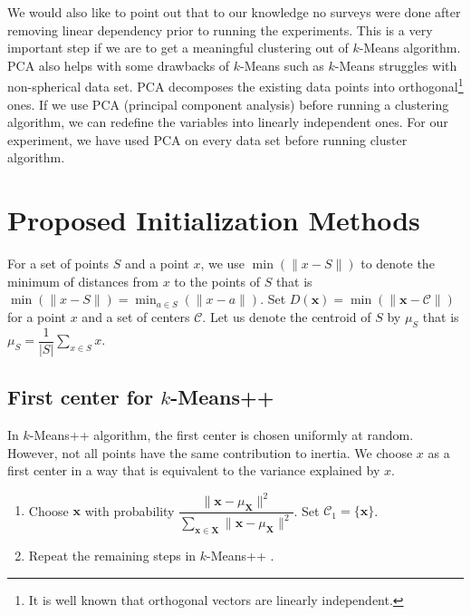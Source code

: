\documentclass[twoside, 11pt]{article}
\newcommand{\x}{\mathbf{x}}
\newcommand{\X}{\mathbf{X}}
\newcommand{\C}{\mathcal{C}}
\begin{document}
	We would also like to point out that to our knowledge no surveys were done after removing linear dependency prior to running the experiments. This is a very important step if we are to get a meaningful clustering out of $k$-Means algorithm. PCA also helps with some drawbacks of $k$-Means such as $k$-Means struggles with non-spherical data set. PCA decomposes the existing data points into orthogonal\footnote{It is well known that orthogonal vectors are linearly independent.} ones. If we use PCA (principal component analysis) before running a clustering algorithm, we can redefine the variables into linearly independent ones. For our experiment, we have used PCA on every data set before running cluster algorithm.
	\section{Proposed Initialization Methods}
	For a set of points $S$ and a point $x$, we use $\min(\|x-S\|)$ to denote the minimum of distances from $x$ to the points of $S$ that is $\min(\| x-S\|)=\min_{a\in S}(\| x-a\|)$. Set $D(\x)=\min(\|\x-\C\|)$ for a point $x$ and a set of centers $\C$. Let us denote the centroid of $S$ by $\mu_S$ that is $\mu_S=\dfrac{1}{|S|}\sum_{x\in S}x$.
	\subsection{First center for $k$-Means++}
	In $k$-Means++ algorithm, the first center is chosen uniformly at random. However, not all points have the same contribution to inertia. We choose $x$ as a first center in a way that is equivalent to the variance explained by $x$.
	\begin{enumerate}[i]
		\item Choose $\x$ with probability $\dfrac{\|\x-\mu_{\X}\|^2}{\sum_{\x\in\X}\|\x-\mu_{\X}\|^2}$. Set $\C_1=\{\x\}$.\label{step:first_center}
		\item Repeat the remaining steps in $k$-Means++ \cite[Section $2.2$, Page $3$]{kmeans++}.
	\end{enumerate}
\end{document}
